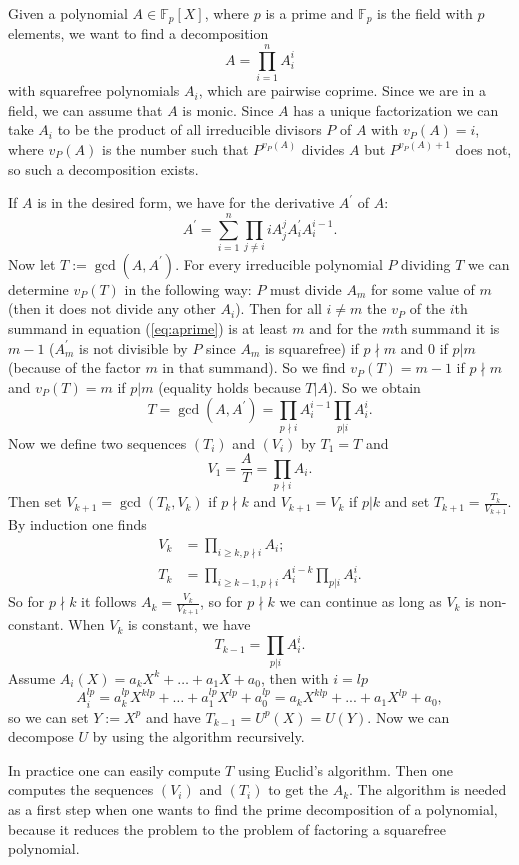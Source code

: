 \documentclass[12pt]{article}
\begin{document}
Given a polynomial $A\in\mathbb{F}_p[X]$, where $p$ is a prime and $\mathbb{F}_p$ is the field with $p$ elements, we want to find a decomposition
$$A=\prod_{i=1}^nA_i^i$$
with squarefree polynomials $A_i$, which are pairwise coprime. Since we are in a field, we can assume that $A$ is monic.
Since $A$ has a unique factorization we can take $A_i$ to be the product of all irreducible divisors $P$ of $A$ with $v_P(A)=i$, where $v_P(A)$ is the number such that $P^{v_P(A)}$ divides $A$ but $P^{v_P(A)+1}$ does not, so such a decomposition exists.

If $A$ is in the desired form, we have for the derivative $A^\prime$ of $A$:
\begin{equation}\label{eq:aprime}
A^\prime=\sum_{i=1}^n\prod_{j\neq i}iA_j^jA_i^\prime A_i^{i-1}.
\end{equation}
Now let $T:=\gcd(A,A^\prime)$. For every irreducible polynomial $P$ dividing $T$ we can determine $v_P(T)$ in the following way: $P$ must divide $A_m$ for some value of $m$ (then it does not divide any other $A_i$). Then for all $i\neq m$ the $v_P$ of the $i$th summand in equation (\ref{eq:aprime}) is at least $m$ and for the $m$th summand it is $m-1$ ($A_m^\prime$ is not divisible by $P$ since $A_m$ is squarefree) if $p\nmid m$ and 0 if $p|m$ (because of the factor $m$ in that summand). So we find $v_P(T)=m-1$ if $p\nmid m$ and $v_P(T)=m$ if $p|m$ (equality holds because $T|A$). So we obtain
$$T=\gcd(A,A^\prime)=\prod_{p\nmid i}A_i^{i-1}\prod_{p|i}A_i^i.$$
Now we define two sequences $(T_i)$ and $(V_i)$ by $T_1=T$ and 
$$V_1=\frac{A}{T}=\prod_{p\nmid i}A_i.$$
Then set $V_{k+1}=\gcd(T_k,V_k)$ if $p\nmid k$ and $V_{k+1}=V_k$ if $p|k$ and set $T_{k+1}=\frac{T_k}{V_{k+1}}$. By induction one finds
\begin{align*}
V_k&=\prod_{i\geq k,p\nmid i}A_i;\\
T_k&=\prod_{i\geq k-1,p\nmid i}A_i^{i-k}\prod_{p|i}A_i^i.
\end{align*}
So for $p\nmid k$ it follows $A_k=\frac{V_k}{V_{k+1}}$, so for $p\nmid k$ we can continue as long as $V_k$ is non-constant. When $V_k$ is constant, we have
$$T_{k-1}=\prod_{p|i}A_i^i.$$
Assume $A_i(X)=a_kX^k+\dots+a_1X+a_0$, then with $i=lp$ $$A_i^{lp}=a_k^{lp}X^{klp}+\dots+a_1^{lp}X^{lp}+a_0^{lp}=a_kX^{klp}+...+a_1X^{lp}+a_0,$$
so we can set $Y:=X^p$ and have $T_{k-1}=U^p(X)=U(Y)$. Now we can decompose $U$ by using the algorithm recursively.

In practice one can easily compute $T$ using Euclid's algorithm. Then one computes the sequences $(V_i)$ and $(T_i)$ to get the $A_k$. The algorithm is needed as a first step when one wants to find the prime decomposition of a polynomial, because it reduces the problem to the problem of factoring a squarefree polynomial.
\end{document}
